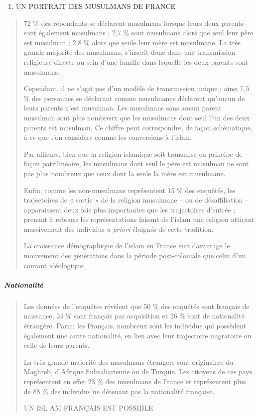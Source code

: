 \begin{enumerate}
\def\labelenumi{\Roman{enumi}.}
\item
  UN PORTRAIT DES MUSULMANS DE FRANCE
\end{enumerate}

\begin{quote}
72 \% des répondants se déclarent musulmans lorsque leurs deux parents
sont également musulmans ; 2,7 \% sont musulmans alors que seul leur
père est musulman ; 2,8 \% alors que seule leur mère est musulmane. La
très grande majorité des musulmans, s'inscrit donc dans une transmission
religieuse directe au sein d'une famille dans laquelle les deux parents
sont musulmans.

Cependant, il ne s'agit pas d'un modèle de transmission unique ; ainsi
7,5 \% des personnes se déclarant comme musulmanes déclarent qu'aucun de
leurs parents n'est musulman. Les musulmans sans aucun parent musulman
sont plus nombreux que les musulmans dont seul l'un des deux parents est
musulman. Ce chiffre peut correspondre, de façon schématique, à ce que
l'on considère comme les conversions à l'islam.

Par ailleurs, bien que la religion islamique soit transmise en principe
de façon patrilinéaire, les musulmans dont seul le père est musulman ne
sont pas plus nombreux que ceux dont la seule la mère est musulmane.

Enfin, comme les non-musulmans représentent 15 \% des enquêtés, les
trajectoires de « sortie » de la religion musulmane -- ou de
désaffiliation --apparaissent deux fois plus importantes que les
trajectoires d'entrée ; prenant à rebours les représentations faisant de
l'islam une religion attirant massivement des individus \emph{a priori}
éloignés de cette tradition.

La croissance démographique de l'islam en France suit davantage le
mouvement des générations dans la période post-coloniale que celui d'un
courant idéologique.
\end{quote}

\hypertarget{nationalituxe9}{%
\subparagraph{Nationalité}\label{nationalituxe9}}

\begin{quote}
Les données de l'enquêtes révèlent que 50 \% des enquêtés sont français
de naissance, 24 \% sont français par acquisition et 26 \% sont de
nationalité étrangère. Parmi les Français, nombreux sont les individus
qui possèdent également une autre nationalité, en lien avec leur
trajectoire migratoire ou celle de leurs parents.

La très grande majorité des musulmans étrangers sont originaires du
Maghreb, d'Afrique Subsaharienne ou de Turquie. Les citoyens de ces pays
représentent en effet 23 \% des musulmans de France et représentent plus
de 88 \% des individus ne détenant pas la nationalité française.

UN ISL AM FRANÇAIS EST POSSIBLE
\end{quote}

